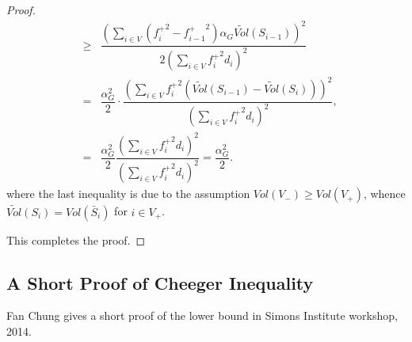 \documentclass[twoside]{article}
\theoremstyle{definition}
\theoremstyle{definition}
\theoremstyle{remark}
\begin{document}
\begin{proof}
\begin{eqnarray*}
& \ge & \dfrac{(\sum_{i\in V}({f^+_i}^2-{f^+_{i-1}}^2) \alpha_G \widetilde{Vol}(S_{i-1}))^2}{2(\sum_{i\in V}{f^+_i}^2d_i)^2} \\
& = & \dfrac{\alpha_G^2}{2} \cdot \dfrac{(\sum_{i\in V}{f^+_{i}}^2(\widetilde{Vol}(S_{i-1})-\widetilde{Vol}(S_{i})) )^2}{(\sum_{i\in V}{f^+_i}^2d_i)^2}, \\
& = & \dfrac{\alpha_G^2}{2}\dfrac{(\sum_{i\in V}{f^+_i}^2d_i)^2}{(\sum_{i\in V}{f^+_i}^2d_i)^2} = \dfrac{\alpha^2_G}{2}.
\end{eqnarray*}
where the last inequality is due to the assumption $Vol(V_-)\ge Vol(V_+)$, whence $\widetilde{Vol}(S_{i}) = Vol(\bar{S}_i)$ for $i\in V_+$.

This completes the proof.
\end{proof}

\subsection{A Short Proof of Cheeger Inequality}
Fan Chung gives a short proof of the lower bound in Simons Institute workshop, 2014.
\end{document}
